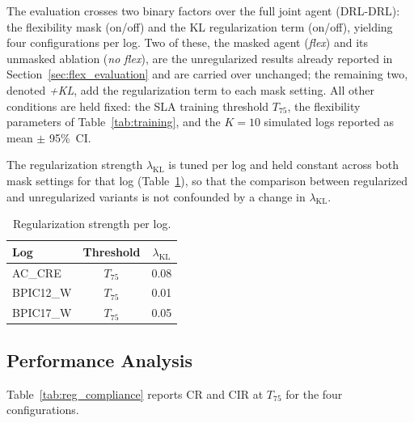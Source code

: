 \documentclass[journal,onecolumn]{IEEEtran}
\begin{document}
The evaluation crosses two binary factors over the full joint agent
(DRL-DRL): the flexibility mask (on/off) and the KL regularization term
(on/off), yielding four configurations per log. Two of these, the
masked agent (\textit{flex}) and its unmasked ablation
(\textit{no flex}), are the unregularized results already reported in
Section~\ref{sec:flex_evaluation} and are carried over unchanged; the
remaining two, denoted \textit{+KL}, add the regularization term to each
mask setting. All other conditions are held fixed: the SLA training
threshold $T_{75}$, the flexibility parameters of
Table~\ref{tab:training}, and the $K=10$ simulated logs reported as
mean $\pm$ 95\%~CI.

The regularization strength $\lambda_{\text{KL}}$ is tuned per log and
held constant across both mask settings for that log
(Table~\ref{tab:reg_lambda}), so that the comparison between regularized
and unregularized variants is not confounded by a change in
$\lambda_{\text{KL}}$.

\begin{table}[!ht]
\centering\small
\setlength{\tabcolsep}{5pt}
\begin{tabular}{lcc}
\toprule
\textbf{Log} & \textbf{Threshold} & $\lambda_{\text{KL}}$ \\
\midrule
AC\_CRE   & $T_{75}$ & 0.08 \\
BPIC12\_W & $T_{75}$ & 0.01 \\
BPIC17\_W & $T_{75}$ & 0.05 \\
\bottomrule
\end{tabular}
\caption{Regularization strength per log.}
\label{tab:reg_lambda}
\end{table}

\subsection{Performance Analysis}
\label{subsec:reg_performance}

Table~\ref{tab:reg_compliance} reports CR and CIR at $T_{75}$ for the
four configurations.
\end{document}
